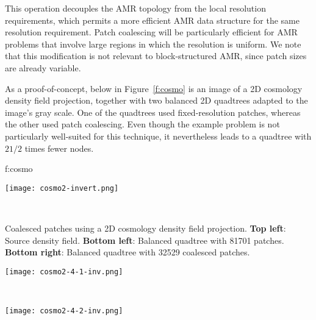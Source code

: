 \documentclass[10pt,twocolumn]{article}
\begin{document}



This operation decouples the AMR topology from the local resolution
requirements, which permits a more efficient AMR data structure for
the same resolution requirement.  Patch coalescing will be
particularly efficient for AMR problems that involve large regions
in which the resolution is uniform.  We note that this modification
is not relevant to block-structured AMR, since patch sizes are already
variable.

As a proof-of-concept, below in Figure~\ref{f:cosmo} is an image of a
2D cosmology density field projection, together with two balanced 2D
quadtrees adapted to the image's gray scale.  One of the quadtrees
used fixed-resolution patches, whereas the other used patch
coalescing.  Even though the example problem is not particularly
well-suited for this technique, it nevertheless leads to a quadtree
with $2 1/2$ times fewer nodes.

 {f:cosmo}{
\begin{minipage}{3.2in}
\begin{minipage}{1.5in}
\texttt{[image: cosmo2-invert.png]}
\end{minipage} \
\begin{minipage}{1.5in} \raggedright
\small Coalesced patches using a 2D cosmology
  density field projection.  \textbf{Top left}: Source density field.
  \textbf{Bottom left}: Balanced quadtree with 81701 patches.
  \textbf{Bottom right}: Balanced quadtree with 32529 coalesced patches.
\end{minipage}
\begin{minipage}{1.5in}
\texttt{[image: cosmo2-4-1-inv.png]}
\end{minipage} \ 
\begin{minipage}{1.5in}
\texttt{[image: cosmo2-4-2-inv.png]}
\end{minipage}
\end{minipage}
}
\end{document}

